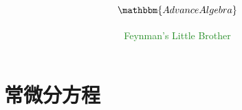 \documentclass[UTF8]{ctexart}
\title{\fontsize{40pt}{80pt} $\mathbbm{Advance Algebra}$}
\author{\textcolor{ForestGreen}{Feynman's Little Brother}}
\begin{document}

\section{常微分方程}
    
    \newpage
\end{document}
